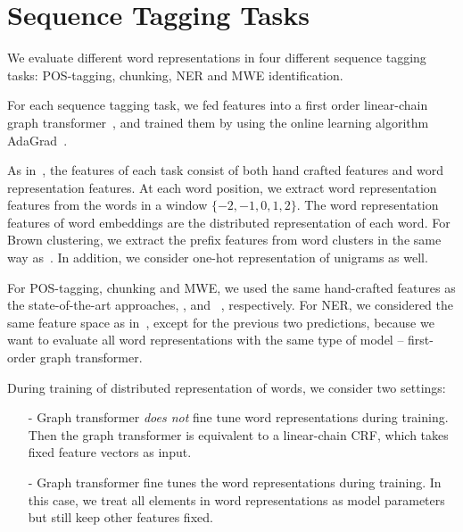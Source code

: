\section{Sequence Tagging Tasks}
\label{sec:SeqTagging}
We evaluate different word representations in four different sequence tagging tasks: POS-tagging, chunking, NER and MWE identification. 

For each sequence tagging task, we fed features into a first order linear-chain graph
transformer~\cite{collobert2011natural}, and trained them by using the online learning algorithm
AdaGrad~\cite{duchi2011adaptive}.

As in~\cite{turian2010word}, the features of each task consist of both hand crafted features and word representation features. At each word position, we extract word representation features from the words in a window $\{-2, -1, 0, 1, 2\}$. The word representation features of word embeddings are the distributed representation of each word.  For Brown clustering, we extract the prefix features from word clusters in the same way as~\cite{turian2010word}. In addition, we consider one-hot representation of unigrams as well.

For POS-tagging, chunking and MWE, we used the same hand-crafted features as the state-of-the-art approaches,  ,  and ~, respectively. For NER, we considered the same feature space as in~\cite{turian2010word}, except for the previous two predictions, because we want to evaluate all word representations with the same type of model -- first-order graph transformer.

During training of distributed representation of words, we consider two settings: 

\begin{small}
\begin{itemize}
\item[-] Graph transformer \textit{does not} fine tune word representations during training. Then the graph transformer is equivalent to a linear-chain CRF, which takes fixed feature vectors as input.
\item[-] Graph transformer fine tunes the word representations during training. In this case, we treat all elements in word representations as model parameters but still keep other features fixed.
\end{itemize}
\end{small}

